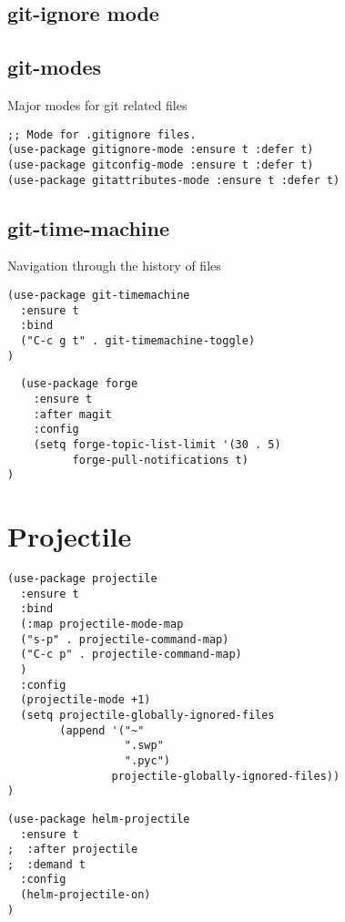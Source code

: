\documentclass[11pt]{article}
\begin{document}
\subsection*{git-ignore mode}
\label{sec:orgbf26fad}


\subsection*{git-modes}
\label{sec:orgaea4829}

Major modes for git related files

\begin{verbatim}
;; Mode for .gitignore files.
(use-package gitignore-mode :ensure t :defer t)
(use-package gitconfig-mode :ensure t :defer t)
(use-package gitattributes-mode :ensure t :defer t)
\end{verbatim}

\subsection*{git-time-machine}
\label{sec:org3362177}

Navigation through the history of files

\begin{verbatim}
(use-package git-timemachine
  :ensure t
  :bind
  ("C-c g t" . git-timemachine-toggle)
)
\end{verbatim}


\begin{verbatim}
  (use-package forge
    :ensure t
    :after magit
    :config
    (setq forge-topic-list-limit '(30 . 5)
          forge-pull-notifications t)
)
\end{verbatim}


\section*{Projectile}
\label{sec:org3693f62}
\begin{verbatim}
(use-package projectile
  :ensure t
  :bind
  (:map projectile-mode-map
  ("s-p" . projectile-command-map)
  ("C-c p" . projectile-command-map)
  )
  :config
  (projectile-mode +1)
  (setq projectile-globally-ignored-files
        (append '("~"
                  ".swp"
                  ".pyc")
                projectile-globally-ignored-files))
)
\end{verbatim}

\begin{verbatim}
(use-package helm-projectile
  :ensure t
;  :after projectile
;  :demand t
  :config
  (helm-projectile-on)
)
\end{verbatim}
\end{document}
